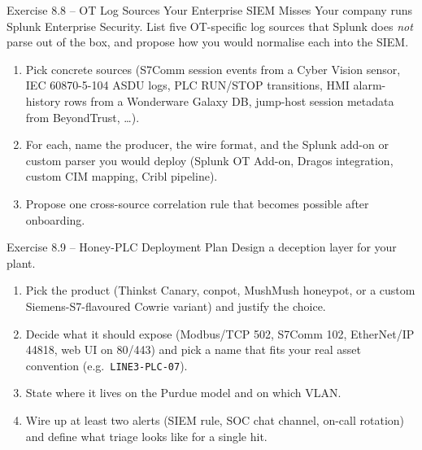 \documentclass[11pt,a4paper]{article}
\begin{document}
\begin{taskbox}{Exercise 8.8 -- OT Log Sources Your Enterprise SIEM Misses}
Your company runs Splunk Enterprise Security. List five OT-specific log sources that Splunk does \emph{not} parse out of the box, and propose how you would normalise each into the SIEM.
\begin{enumerate}\setlength{\itemsep}{1pt}
  \item Pick concrete sources (S7Comm session events from a Cyber Vision sensor, IEC 60870-5-104 ASDU logs, PLC RUN/STOP transitions, HMI alarm-history rows from a Wonderware Galaxy DB, jump-host session metadata from BeyondTrust, \ldots).
  \item For each, name the producer, the wire format, and the Splunk add-on or custom parser you would deploy (Splunk OT Add-on, Dragos integration, custom CIM mapping, Cribl pipeline).
  \item Propose one cross-source correlation rule that becomes possible after onboarding.
\end{enumerate}
\end{taskbox}

\begin{taskbox}{Exercise 8.9 -- Honey-PLC Deployment Plan}
Design a deception layer for your plant.
\begin{enumerate}\setlength{\itemsep}{1pt}
  \item Pick the product (Thinkst Canary, conpot, MushMush honeypot, or a custom Siemens-S7-flavoured Cowrie variant) and justify the choice.
  \item Decide what it should expose (Modbus/TCP 502, S7Comm 102, EtherNet/IP 44818, web UI on 80/443) and pick a name that fits your real asset convention (e.g.\ \texttt{LINE3-PLC-07}).
  \item State where it lives on the Purdue model and on which VLAN.
  \item Wire up at least two alerts (SIEM rule, SOC chat channel, on-call rotation) and define what triage looks like for a single hit.
\end{enumerate}
\end{taskbox}
\end{document}
